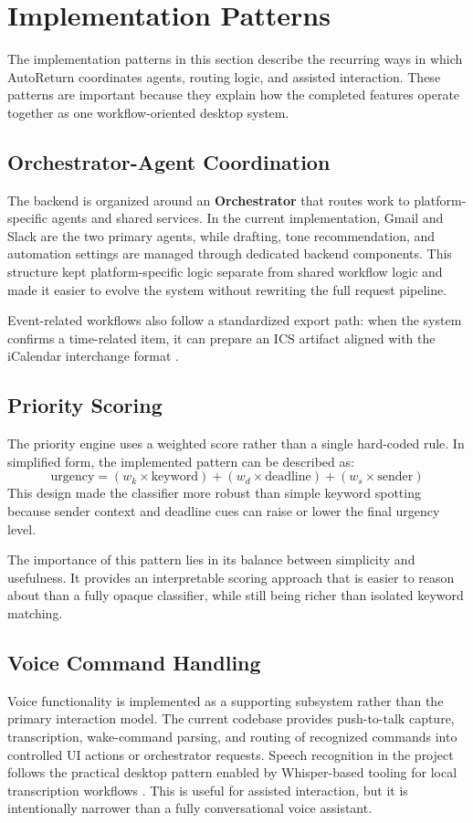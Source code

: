 \section{Implementation Patterns}
The implementation patterns in this section describe the recurring ways in which AutoReturn coordinates agents, routing logic, and assisted interaction. These patterns are important because they explain how the completed features operate together as one workflow-oriented desktop system.

\subsection{Orchestrator-Agent Coordination}
The backend is organized around an \textbf{Orchestrator} that routes work to platform-specific agents and shared services. In the current implementation, Gmail and Slack are the two primary agents, while drafting, tone recommendation, and automation settings are managed through dedicated backend components. This structure kept platform-specific logic separate from shared workflow logic and made it easier to evolve the system without rewriting the full request pipeline.

Event-related workflows also follow a standardized export path: when the system confirms a time-related item, it can prepare an ICS artifact aligned with the iCalendar interchange format \cite{rfc5545}.

\subsection{Priority Scoring}
The priority engine uses a weighted score rather than a single hard-coded rule. In simplified form, the implemented pattern can be described as:
\[
\text{urgency} = (w_k \times \text{keyword}) + (w_d \times \text{deadline}) + (w_s \times \text{sender})
\]
This design made the classifier more robust than simple keyword spotting because sender context and deadline cues can raise or lower the final urgency level.

The importance of this pattern lies in its balance between simplicity and usefulness. It provides an interpretable scoring approach that is easier to reason about than a fully opaque classifier, while still being richer than isolated keyword matching.

\subsection{Voice Command Handling}
Voice functionality is implemented as a supporting subsystem rather than the primary interaction model. The current codebase provides push-to-talk capture, transcription, wake-command parsing, and routing of recognized commands into controlled UI actions or orchestrator requests. Speech recognition in the project follows the practical desktop pattern enabled by Whisper-based tooling for local transcription workflows \cite{whisper2023}. This is useful for assisted interaction, but it is intentionally narrower than a fully conversational voice assistant.

